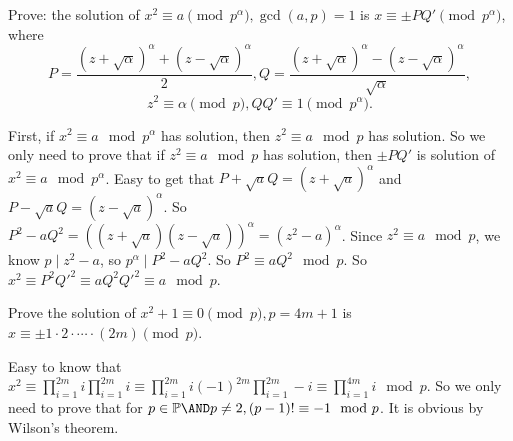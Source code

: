 \documentclass{ctexart}
\begin{document}
\begin{problem}\label{pro:5}
  Prove: the solution of \(x^2 \equiv a\pmod{p^\alpha},\gcd(a,p)=1\) is \(x \equiv \pm PQ'\pmod{p^\alpha}\), where \[
    P=\frac{(z + \sqrt{\alpha})^\alpha + (z - \sqrt{\alpha})^\alpha}{2}, Q=\frac{(z + \sqrt{\alpha})^\alpha - (z-\sqrt{\alpha})^\alpha}{\sqrt{\alpha}},
  \]
  \[
    z^2\equiv \alpha\pmod{p}, QQ' \equiv 1 \pmod{p^\alpha}.
  \]
\end{problem}
\begin{solution}
  First, if \(x^2 \equiv a \mod p^\alpha\) has solution, then \(z^2 \equiv a \mod p\) has solution.
  So we only need to prove that if \(z^2 \equiv a \mod p\) has solution, then \(\pm PQ'\) is solution of \(x^2 \equiv a \mod p^\alpha\).
  Easy to get that \(P+\sqrt{a}Q=(z+\sqrt{a})^\alpha\) and \(P-\sqrt{a}Q=(z-\sqrt{a})^\alpha\).
  So \(P^2-aQ^2=((z+\sqrt{a})(z-\sqrt{a}))^\alpha =(z^2-a)^\alpha\).
  Since \(z^2 \equiv a \mod p\), we know \(p \mid z^2-a\), so \(p^\alpha \mid P^2-aQ^2\).
  So \(P^2 \equiv aQ^2 \mod p\).
  So \(x^2 \equiv P^2 Q'^2 \equiv aQ^2 Q'^2 \equiv a \mod p\).
\end{solution}

\begin{problem}\label{pro:6}
  Prove the solution of \(x^2 + 1 \equiv 0 \pmod{p},p=4m + 1\) is \(x \equiv \pm 1 \cdot 2 \cdot \cdots \cdot (2m)\pmod{p}\).
\end{problem}
\begin{solution}
  Easy to know that \(x^2 \equiv \prod_{i=1}^{2m} i \prod_{i=1}^{2m} i \equiv \prod_{i=1}^{2m} i (-1)^{2m} \prod_{i=1}^{2m} -i \equiv \prod_{i=1}^{4m} i \mod p\).
  So we only need to prove that for \(p \in \mathbb{P} \AND p \neq 2,(p-1)! \equiv -1 \mod p\).
  It is obvious by Wilson's theorem.
\end{solution}
\end{document}
